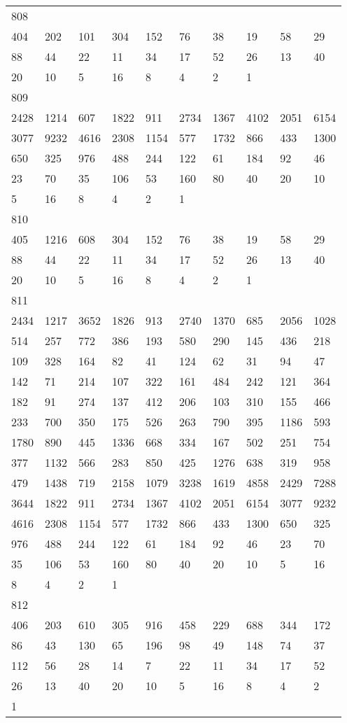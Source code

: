 \begin{longtable}{*{10}{l}}
808&&&&&&&&&\\
404& 202& 101& 304& 152& 76& 38& 19& 58& 29\\
88& 44& 22& 11& 34& 17& 52& 26& 13& 40\\
20& 10& 5& 16& 8& 4& 2& 1& \\

809&&&&&&&&&\\
2428& 1214& 607& 1822& 911& 2734& 1367& 4102& 2051& 6154\\
3077& 9232& 4616& 2308& 1154& 577& 1732& 866& 433& 1300\\
650& 325& 976& 488& 244& 122& 61& 184& 92& 46\\
23& 70& 35& 106& 53& 160& 80& 40& 20& 10\\
5& 16& 8& 4& 2& 1& \\

810&&&&&&&&&\\
405& 1216& 608& 304& 152& 76& 38& 19& 58& 29\\
88& 44& 22& 11& 34& 17& 52& 26& 13& 40\\
20& 10& 5& 16& 8& 4& 2& 1& \\

811&&&&&&&&&\\
2434& 1217& 3652& 1826& 913& 2740& 1370& 685& 2056& 1028\\
514& 257& 772& 386& 193& 580& 290& 145& 436& 218\\
109& 328& 164& 82& 41& 124& 62& 31& 94& 47\\
142& 71& 214& 107& 322& 161& 484& 242& 121& 364\\
182& 91& 274& 137& 412& 206& 103& 310& 155& 466\\
233& 700& 350& 175& 526& 263& 790& 395& 1186& 593\\
1780& 890& 445& 1336& 668& 334& 167& 502& 251& 754\\
377& 1132& 566& 283& 850& 425& 1276& 638& 319& 958\\
479& 1438& 719& 2158& 1079& 3238& 1619& 4858& 2429& 7288\\
3644& 1822& 911& 2734& 1367& 4102& 2051& 6154& 3077& 9232\\
4616& 2308& 1154& 577& 1732& 866& 433& 1300& 650& 325\\
976& 488& 244& 122& 61& 184& 92& 46& 23& 70\\
35& 106& 53& 160& 80& 40& 20& 10& 5& 16\\
8& 4& 2& 1& \\

812&&&&&&&&&\\
406& 203& 610& 305& 916& 458& 229& 688& 344& 172\\
86& 43& 130& 65& 196& 98& 49& 148& 74& 37\\
112& 56& 28& 14& 7& 22& 11& 34& 17& 52\\
26& 13& 40& 20& 10& 5& 16& 8& 4& 2\\
1& \\


\end{longtable}
